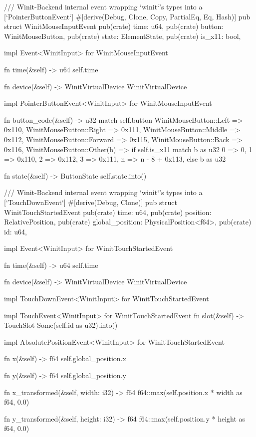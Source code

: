 /// Winit-Backend internal event wrapping `winit`'s types into a [`PointerButtonEvent`]
#[derive(Debug, Clone, Copy, PartialEq, Eq, Hash)]
pub struct WinitMouseInputEvent {
    pub(crate) time: u64,
    pub(crate) button: WinitMouseButton,
    pub(crate) state: ElementState,
    pub(crate) is_x11: bool,
}

impl Event<WinitInput> for WinitMouseInputEvent {
    fn time(&self) -> u64 {
        self.time
    }

    fn device(&self) -> WinitVirtualDevice {
        WinitVirtualDevice
    }
}

impl PointerButtonEvent<WinitInput> for WinitMouseInputEvent {
    fn button_code(&self) -> u32 {
        match self.button {
            WinitMouseButton::Left => 0x110,
            WinitMouseButton::Right => 0x111,
            WinitMouseButton::Middle => 0x112,
            WinitMouseButton::Forward => 0x115,
            WinitMouseButton::Back => 0x116,
            WinitMouseButton::Other(b) => {
                if self.is_x11 {
                    match b as u32 {
                        0 => 0,
                        1 => 0x110,
                        2 => 0x112,
                        3 => 0x111,
                        n => n - 8 + 0x113,
                    }
                } else {
                    b as u32
                }
            }
        }
    }

    fn state(&self) -> ButtonState {
        self.state.into()
    }
}

/// Winit-Backend internal event wrapping `winit`'s types into a [`TouchDownEvent`]
#[derive(Debug, Clone)]
pub struct WinitTouchStartedEvent {
    pub(crate) time: u64,
    pub(crate) position: RelativePosition,
    pub(crate) global_position: PhysicalPosition<f64>,
    pub(crate) id: u64,
}

impl Event<WinitInput> for WinitTouchStartedEvent {
    fn time(&self) -> u64 {
        self.time
    }

    fn device(&self) -> WinitVirtualDevice {
        WinitVirtualDevice
    }
}

impl TouchDownEvent<WinitInput> for WinitTouchStartedEvent {}

impl TouchEvent<WinitInput> for WinitTouchStartedEvent {
    fn slot(&self) -> TouchSlot {
        Some(self.id as u32).into()
    }
}

impl AbsolutePositionEvent<WinitInput> for WinitTouchStartedEvent {
    fn x(&self) -> f64 {
        self.global_position.x
    }

    fn y(&self) -> f64 {
        self.global_position.y
    }

    fn x_transformed(&self, width: i32) -> f64 {
        f64::max(self.position.x * width as f64, 0.0)
    }

    fn y_transformed(&self, height: i32) -> f64 {
        f64::max(self.position.y * height as f64, 0.0)
    }
}

